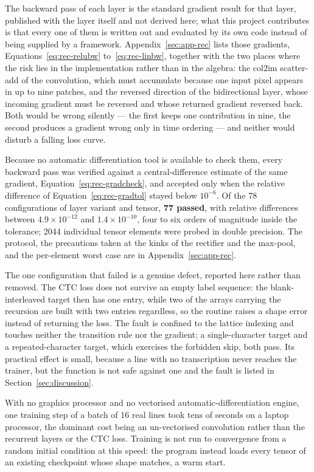 The backward pass of each layer is the standard gradient result for that layer, published with the layer itself and not derived here; what this project contributes is that every one of them is written out and evaluated by its own code instead of being supplied by a framework.
Appendix~\ref{sec:app-rec} lists those gradients, Equations~\ref{eq:rec-relubw} to~\ref{eq:rec-linbw}, together with the two places where the risk lies in the implementation rather than in the algebra: the col2im scatter-add of the convolution, which must accumulate because one input pixel appears in up to nine patches, and the reversed direction of the bidirectional layer, whose incoming gradient must be reversed and whose returned gradient reversed back.
Both would be wrong silently --- the first keeps one contribution in nine, the second produces a gradient wrong only in time ordering --- and neither would disturb a falling loss curve.

Because no automatic differentiation tool is available to check them, every backward pass was verified against a central-difference estimate of the same gradient, Equation~\ref{eq:rec-gradcheck}, and accepted only when the relative difference of Equation~\ref{eq:rec-gradtol} stayed below $10^{-6}$.
Of the 78 configurations of layer variant and tensor, \textbf{77 passed}, with relative differences between $4.9\times10^{-12}$ and $1.4\times10^{-10}$, four to six orders of magnitude inside the tolerance; 2044 individual tensor elements were probed in double precision.
The protocol, the precautions taken at the kinks of the rectifier and the max-pool, and the per-element worst case are in Appendix~\ref{sec:app-rec}.

The one configuration that failed is a genuine defect, reported here rather than removed.
The CTC loss does not survive an empty label sequence: the blank-interleaved target then has one entry, while two of the arrays carrying the recursion are built with two entries regardless, so the routine raises a shape error instead of returning the loss.
The fault is confined to the lattice indexing and touches neither the transition rule nor the gradient; a single-character target and a repeated-character target, which exercises the forbidden skip, both pass.
Its practical effect is small, because a line with no transcription never reaches the trainer, but the function is not safe against one and the fault is listed in Section~\ref{sec:discussion}.

With no graphics processor and no vectorised automatic-differentiation engine, one training step of a batch of 16 real lines took tens of seconds on a laptop processor, the dominant cost being an un-vectorised convolution rather than the recurrent layers or the CTC loss.
Training is not run to convergence from a random initial condition at this speed: the program instead loads every tensor of an existing checkpoint whose shape matches, a warm start.


